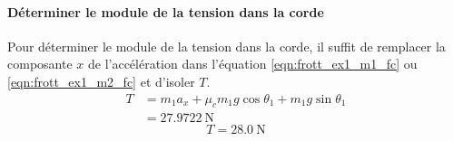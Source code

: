 \documentclass{tufte-handout}
\begin{document}
\paragraph{Déterminer le module de la tension dans la corde}

Pour déterminer le module de la tension dans la corde, il suffit de remplacer
la composante $x$ de l'accélération dans l'équation \ref{eqn:frott_ex1_m1_fc}
ou \ref{eqn:frott_ex1_m2_fc} et d'isoler $T$.
\begin{align*}
  T &= m_1a_x + \mu_c m_1 g \cos\theta_1 + m_1 g \sin\theta_1 \\
    &= \SI{27.9722}{\newton}
\end{align*}
\[
  \boxed{T = \SI{28.0}{\newton}}
\]
\end{document}
